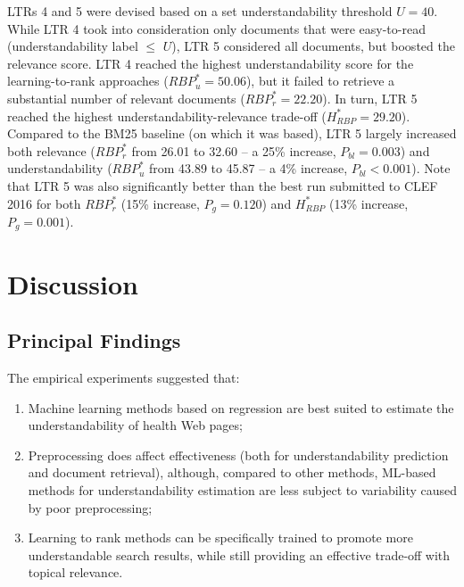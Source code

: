 \documentclass[10pt,a4paper]{article}
\begin{document}
LTRs 4 and 5 were devised based on a set understandability threshold $U=40$. While LTR 4 took into consideration only documents that were easy-to-read (understandability label $\le$ $U$), LTR 5 considered all documents, but boosted the relevance score. LTR 4 reached the highest understandability score for the learning-to-rank approaches ($RBP_u^{*}=50.06$), but it failed to retrieve a substantial number of relevant documents ($RBP_r^{*}=22.20$). In turn, LTR 5 reached the highest
understandability-relevance trade-off ($H_{RBP}^{*}=29.20$). Compared to the BM25 baseline (on which it was based), LTR 5  largely increased both relevance ($RBP_r^*$ from 26.01 to 32.60 -- a 25\% increase, $P_{bl}=0.003$) and understandability ($RBP_u^*$ from 43.89 to 45.87 -- a 4\% increase, $P_{bl}<0.001$). Note that LTR 5 was also significantly better than the best run submitted to CLEF 2016 for both $RBP_r^{*}$ (15\% increase, $P_{g}=0.120$) and $H_{RBP}^{*}$ (13\% increase, $P_{g}=0.001$).


\section*{Discussion}

\subsection*{Principal Findings}

The empirical experiments suggested that:

\vspace{-4pt}
\begin{enumerate}[leftmargin=*]
	\item Machine learning methods based on regression are best suited to estimate the understandability of health Web pages;
	\item Preprocessing does affect effectiveness (both for understandability prediction and document retrieval), although, compared to other methods, ML-based methods for understandability estimation are less subject to variability caused by poor preprocessing;
	\item Learning to rank methods can be specifically trained to promote more understandable search results, while still providing an effective trade-off with topical relevance.
\end{enumerate} 
\end{document}

